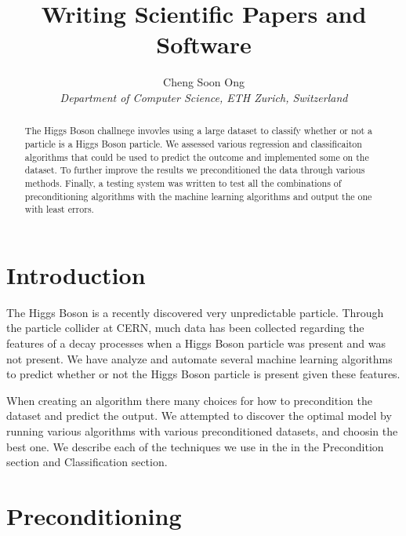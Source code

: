 \documentclass[10pt,conference,compsocconf]{IEEEtran}
\begin{document}
\title{Writing Scientific Papers and Software}

\author{
  Cheng Soon Ong\\
  \textit{Department of Computer Science, ETH Zurich, Switzerland}
}

\maketitle

\begin{abstract}
 The Higgs Boson challnege invovles using a large dataset to classify whether or not a particle is a Higgs Boson particle. We assessed various regression and classificaiton algorithms that could be used to predict the outcome and implemented some on the dataset. To further improve the results we preconditioned the data through various methods. Finally, a testing system was written to test all the combinations of preconditioning algorithms with the machine learning algorithms and output the one with least errors. 
\end{abstract}

\section{Introduction}
The Higgs Boson is a recently discovered very unpredictable particle. Through the particle collider at CERN, much data has been collected regarding the features of a decay processes when a Higgs Boson particle was present and was not present. We have analyze and automate several machine learning algorithms to predict whether or not the Higgs Boson particle is present given these features. 

When creating an algorithm there many choices for how to precondition the dataset and predict the output. We attempted to discover the optimal model by running various algorithms with various preconditioned datasets, and choosin the best one. We describe each of the techniques we use in the in the Precondition section and Classification section. 

\section{Preconditioning}
\label{sec:PreCond}
\end{document}
